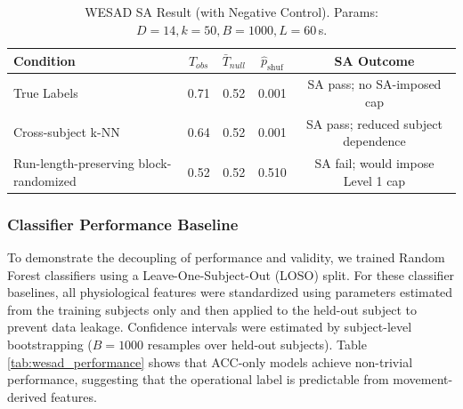 \documentclass[journal]{IEEEtran}
\begin{document}
\begin{table}[t]
\caption{WESAD SA Result (with Negative Control). Params: $D=14, k=50, B=1000, L=60$\,s.}
\label{tab:wesad_sa}
\centering
\begin{tabular}{@{}lcccc@{}}
\toprule
\textbf{Condition} & \textbf{$T_{obs}$} & \textbf{$\bar{T}_{null}$} & \textbf{$\hat{p}_{\mathrm{shuf}}$} & \textbf{SA Outcome} \\
\midrule
True Labels        & 0.71 & 0.52 & 0.001 & SA pass; no SA-imposed cap \\
Cross-subject k-NN & 0.64 & 0.52 & 0.001 & SA pass; reduced subject dependence \\
Run-length-preserving block-randomized & 0.52 & 0.52 & 0.510 & SA fail; would impose Level 1 cap \\
\bottomrule
\end{tabular}
\end{table}

\subsubsection{Classifier Performance Baseline}
To demonstrate the decoupling of performance and validity, we trained Random Forest classifiers using a Leave-One-Subject-Out (LOSO) split. For these classifier baselines, all physiological features were standardized using parameters estimated from the training subjects only and then applied to the held-out subject to prevent data leakage. Confidence intervals were estimated by subject-level bootstrapping ($B=1000$ resamples over held-out subjects). Table \ref{tab:wesad_performance} shows that ACC-only models achieve non-trivial performance, suggesting that the operational label is predictable from movement-derived features. 
\end{document}
